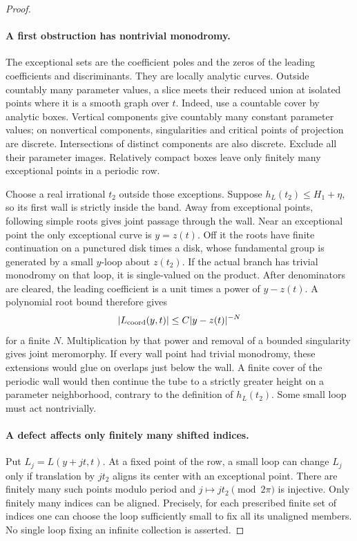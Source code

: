 \begin{proof}
\paragraph{A first obstruction has nontrivial monodromy.}
The exceptional sets are the coefficient poles and the
zeros of the leading coefficients and discriminants.
They are locally analytic curves.  Outside countably
many parameter values, a slice meets their reduced union
at isolated points where it is a smooth graph over \(t\).
Indeed, use a countable cover by analytic boxes.  Vertical
components give countably many constant parameter values;
on nonvertical components, singularities and critical
points of projection are discrete.  Intersections of
distinct components are also discrete.  Exclude all their
parameter images.  Relatively compact boxes leave only
finitely many exceptional points in a periodic row.

Choose a real irrational \(t_2\) outside those exceptions.
Suppose \(h_L(t_2)\le H_1+\eta\), so its first wall is
strictly inside the band.  Away from exceptional points,
following simple roots gives joint passage through the
wall.  Near an exceptional point the only exceptional
curve is \(y=z(t)\).  Off it the roots have finite
continuation on a punctured disk times a disk, whose
fundamental group is generated by a small \(y\)-loop
about \(z(t_2)\).  If the actual branch has trivial
monodromy on that loop, it is single-valued on the product.
After denominators are cleared, the leading coefficient
is a unit times a power of \(y-z(t)\).  A polynomial root
bound therefore gives
\[
 |L_{\rm coord}(y,t)|\le C|y-z(t)|^{-N}
\]
for a finite \(N\).  Multiplication by that power and
removal of a bounded singularity gives joint meromorphy.
If every wall point had trivial monodromy, these
extensions would glue on overlaps just below the wall.
A finite cover of the periodic wall would then continue
the tube to a strictly greater height on a parameter
neighborhood, contrary to the definition of \(h_L(t_2)\).
Some small loop must act nontrivially.

\paragraph{A defect affects only finitely many shifted indices.}
Put \(L_j=L(y+jt,t)\).  At a fixed point of the row, a
small loop can change \(L_j\) only if translation by
\(jt_2\) aligns its center with an exceptional point.
There are finitely many such points modulo period and
\(j\mapsto jt_2\pmod{2\pi}\) is injective.  Only finitely
many indices can be aligned.  Precisely, for each prescribed
finite set of indices one can choose the loop sufficiently
small to fix all its unaligned members.  No single loop
fixing an infinite collection is asserted.


\end{proof}
